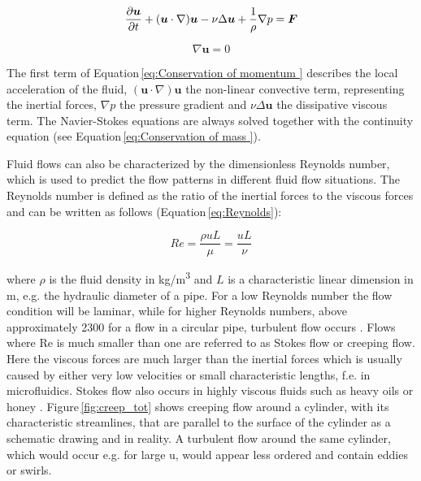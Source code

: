 \begin{equation}
{\partial{\boldsymbol u}\over{\partial t}} + ({\boldsymbol u} \cdot \nabla) {\boldsymbol u} - \nu\Delta{\boldsymbol u}+ \frac{1}{\rho}\nabla p = {\boldsymbol F}
\label{eq:Conservation of momentum }
\end{equation}

\begin{equation}
\nabla{\boldsymbol u} = 0
\label{eq:Conservation of mass }
\end{equation}
 
The first term of Equation\,\ref{eq:Conservation of momentum } describes the local acceleration of the fluid, $({\boldsymbol u} \cdot \nabla) {\boldsymbol u}$ the non-linear convective term, representing the inertial forces, $\nabla p$ the pressure gradient and $\nu\Delta{\boldsymbol u}$ the dissipative viscous term. The Navier-Stokes equations are always solved together with the continuity equation (see Equation\,\ref{eq:Conservation of mass }).
 
Fluid flows can also be characterized by the dimensionless Reynolds number, which is used to predict the flow patterns in different fluid flow situations. The Reynolds number is defined as the ratio of the inertial forces to the viscous forces and can be written as follows (Equation\,\ref{eq:Reynolds}):  

\begin{equation}
Re=\frac{\rho u L}{\mu}=\frac{uL}{\nu}
\label{eq:Reynolds}
\end{equation}

where $\rho$ is the fluid density in kg/m\textsuperscript{3} and $L$ is a characteristic linear dimension in m, e.g. the hydraulic diameter of a pipe. For a low Reynolds number the flow condition will be laminar, while for higher Reynolds numbers, above approximately 2300 for a flow in a circular pipe, turbulent flow occurs \cite{schwarze2012cfd}. Flows where Re is much smaller than one are referred to as Stokes flow or creeping flow. Here the viscous forces are much larger than the inertial forces which is usually caused by either very low velocities or small characteristic lengths, f.e. in microfluidics. Stokes flow also occurs in highly viscous fluids such as heavy oils or honey \cite{lautrup2004physics}. Figure\,\ref{fig:creep_tot} shows creeping flow around a cylinder, with its characteristic streamlines, that are parallel to the surface of the cylinder as a schematic drawing and in reality. A turbulent flow around the same cylinder, which would occur e.g. for large u, would appear less ordered and contain eddies or swirls.

